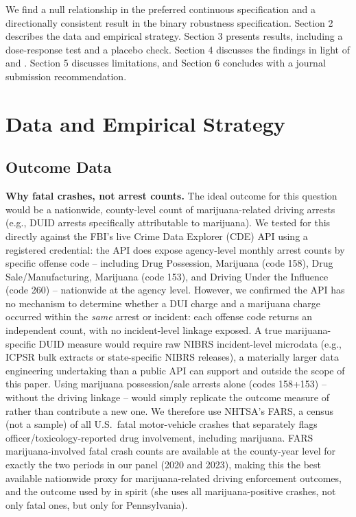 \documentclass[11pt]{article}
\begin{document}
We find a null relationship in the preferred continuous specification
and a directionally consistent result in the binary robustness
specification. Section 2 describes the data and empirical strategy.
Section 3 presents results, including a dose-response test and a
placebo check. Section 4 discusses the findings in light of
\citet{HaoCowan2020} and \citet{Moyer2026}. Section 5 discusses
limitations, and Section 6 concludes with a journal submission
recommendation.

\section{Data and Empirical Strategy}

\subsection{Outcome Data}

\textbf{Why fatal crashes, not arrest counts.} The ideal outcome for
this question would be a nationwide, county-level count of
marijuana-related driving arrests (e.g., DUID arrests specifically
attributable to marijuana). We tested for this directly against the
FBI's live Crime Data Explorer (CDE) API using a registered
credential: the API does expose agency-level monthly arrest counts by
specific offense code -- including Drug Possession, Marijuana (code
158), Drug Sale/Manufacturing, Marijuana (code 153), and Driving Under
the Influence (code 260) -- nationwide at the agency level. However,
we confirmed the API has no mechanism to determine whether a DUI
charge and a marijuana charge occurred within the \emph{same} arrest
or incident: each offense code returns an independent count, with no
incident-level linkage exposed. A true marijuana-specific DUID measure
would require raw NIBRS incident-level microdata (e.g., ICPSR bulk
extracts or state-specific NIBRS releases), a materially larger data
engineering undertaking than a public API can support and outside the
scope of this paper. Using marijuana possession/sale arrests alone
(codes 158+153) -- without the driving linkage -- would simply
replicate the outcome measure of \citet{HaoCowan2020} rather than
contribute a new one. We therefore use NHTSA's FARS, a census (not a
sample) of all U.S.\ fatal motor-vehicle crashes that separately flags
officer/toxicology-reported drug involvement, including marijuana.
FARS marijuana-involved fatal crash counts are available at the
county-year level for exactly the two periods in our panel (2020 and
2023), making this the best available nationwide proxy for
marijuana-related driving enforcement outcomes, and the outcome used
by \citet{Moyer2026} in spirit (she uses all marijuana-positive
crashes, not only fatal ones, but only for Pennsylvania).
\end{document}
